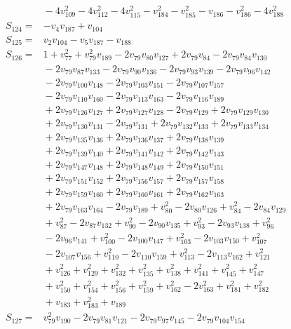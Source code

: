 \begin{align*}
&{}-4v_{109}^{2}-4v_{112}^{2}-4v_{115}^{2}-v_{184}^{2}-v_{185}^{2}-v_{186}-v_{186}^{2}-4v_{188}^{2}\\
S_{124}={}&-v_{4}v_{187}+v_{104}\\
S_{125}={}&v_{2}v_{104}-v_{5}v_{187}-v_{188}\\
S_{126}={}&1+v_{77}^{2}+v_{79}^{2}v_{189}-2v_{79}v_{80}v_{127}+2v_{79}v_{84}-2v_{79}v_{84}v_{130}\\
&{}-2v_{79}v_{87}v_{133}-2v_{79}v_{90}v_{136}-2v_{79}v_{93}v_{139}-2v_{79}v_{96}v_{142}\\
&{}-2v_{79}v_{100}v_{148}-2v_{79}v_{103}v_{151}-2v_{79}v_{107}v_{157}\\
&{}-2v_{79}v_{110}v_{160}-2v_{79}v_{113}v_{163}-2v_{79}v_{116}v_{189}\\
&{}+2v_{79}v_{126}v_{127}+2v_{79}v_{127}v_{128}-2v_{79}v_{129}+2v_{79}v_{129}v_{130}\\
&{}+2v_{79}v_{130}v_{131}-2v_{79}v_{131}+2v_{79}v_{132}v_{133}+2v_{79}v_{133}v_{134}\\
&{}+2v_{79}v_{135}v_{136}+2v_{79}v_{136}v_{137}+2v_{79}v_{138}v_{139}\\
&{}+2v_{79}v_{139}v_{140}+2v_{79}v_{141}v_{142}+2v_{79}v_{142}v_{143}\\
&{}+2v_{79}v_{147}v_{148}+2v_{79}v_{148}v_{149}+2v_{79}v_{150}v_{151}\\
&{}+2v_{79}v_{151}v_{152}+2v_{79}v_{156}v_{157}+2v_{79}v_{157}v_{158}\\
&{}+2v_{79}v_{159}v_{160}+2v_{79}v_{160}v_{161}+2v_{79}v_{162}v_{163}\\
&{}+2v_{79}v_{163}v_{164}-2v_{79}v_{189}+v_{80}^{2}-2v_{80}v_{126}+v_{84}^{2}-2v_{84}v_{129}\\
&{}+v_{87}^{2}-2v_{87}v_{132}+v_{90}^{2}-2v_{90}v_{135}+v_{93}^{2}-2v_{93}v_{138}+v_{96}^{2}\\
&{}-2v_{96}v_{141}+v_{100}^{2}-2v_{100}v_{147}+v_{103}^{2}-2v_{103}v_{150}+v_{107}^{2}\\
&{}-2v_{107}v_{156}+v_{110}^{2}-2v_{110}v_{159}+v_{113}^{2}-2v_{113}v_{162}+v_{121}^{2}\\
&{}+v_{126}^{2}+v_{129}^{2}+v_{132}^{2}+v_{135}^{2}+v_{138}^{2}+v_{141}^{2}+v_{145}^{2}+v_{147}^{2}\\
&{}+v_{150}^{2}+v_{154}^{2}+v_{156}^{2}+v_{159}^{2}+v_{162}^{2}-2v_{163}^{2}+v_{181}^{2}+v_{182}^{2}\\
&{}+v_{183}+v_{183}^{2}+v_{189}\\
S_{127}={}&v_{79}^{2}v_{190}-2v_{79}v_{81}v_{121}-2v_{79}v_{97}v_{145}-2v_{79}v_{104}v_{154}\\

\end{align*}
